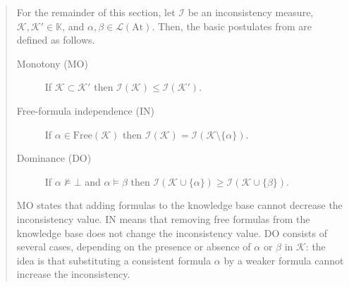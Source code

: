 \begin{quotation}
    For the remainder of this section, let $\mathcal{I}$ be an inconsistency measure, $\mathcal{K}, \mathcal{K}' \in \mathbb{K}$, and $\alpha, \beta \in \mathcal{L}(\text{At})$. Then, the basic postulates from \cite{Hunter2006} are defined as follows.

    \begin{description}
        \item[Monotony (MO)] If $\mathcal{K} \subset \mathcal{K}'$ then $\mathcal{I}(\mathcal{K}) \leq \mathcal{I}(\mathcal{K}')$.
        \item[Free-formula independence (IN)] If $\alpha \in \text{Free}(\mathcal{K})$ then $\mathcal{I}(\mathcal{K}) = \mathcal{I}(\mathcal{K} \setminus \{\alpha\})$.
        \item[Dominance (DO)] If $\alpha \not\models \bot$ and $\alpha \models \beta$ then $\mathcal{I}(\mathcal{K} \cup \{\alpha\}) \geq \mathcal{I}(\mathcal{K} \cup \{\beta\})$.
    \end{description}

    MO states that adding formulas to the knowledge base cannot decrease the inconsistency value. IN means that removing free formulas from the knowledge base does not change the inconsistency value. DO consists of several cases, depending on the presence or absence of $\alpha$ or $\beta$ in $\mathcal{K}$: the idea is that substituting a consistent formula $\alpha$ by a weaker formula cannot increase the inconsistency.
\end{quotation}
